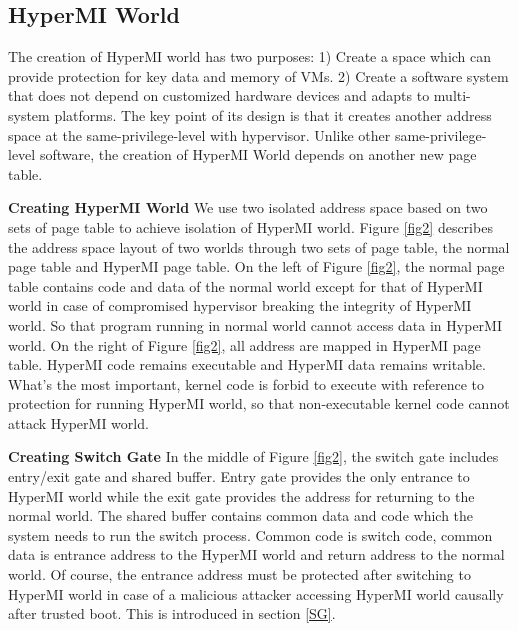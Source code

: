 \documentclass[conference]{IEEEtran}
\begin{document}
\subsection{HyperMI World} \label {HWorld}

The creation of HyperMI world has two purposes: 1) Create a space which can provide protection for key data and memory of VMs. 2) Create a software system that does not depend on customized hardware devices and adapts to multi-system platforms. The key point of its design is that it creates another address space at the same-privilege-level with hypervisor. Unlike other same-privilege-level software, the creation of HyperMI World depends on another new page table.

\textbf{Creating HyperMI World}
 We use two isolated address space based on two sets of page table to achieve isolation of HyperMI world.
Figure \ref{fig2} describes the address space layout of two worlds through two sets of page table, the normal page table and HyperMI page table. On the left of Figure \ref{fig2}, the normal page table contains code and data of the normal world except for that of HyperMI world in case of compromised hypervisor breaking the integrity of HyperMI world. So that program running in normal world cannot access data in HyperMI world. On the right of Figure \ref{fig2}, all address are mapped in HyperMI page table.
HyperMI code remains executable and HyperMI data remains writable. What's the most important, kernel code is forbid to execute with reference to protection for running HyperMI world, so that non-executable kernel code  cannot attack HyperMI world.

\textbf{Creating Switch Gate}
In the middle of Figure \ref{fig2}, the switch gate includes entry/exit gate and shared buffer. Entry gate provides the only entrance to HyperMI world while the exit gate provides the address for returning to the normal world. The shared buffer contains common data and code which the system needs to run the switch process. Common code is switch code, common data is entrance address to the HyperMI world and return address to the normal world. 
Of course, the entrance address must be protected after switching to HyperMI world in case of a malicious attacker accessing HyperMI world causally after trusted boot. This is introduced in section \ref{SG}.
\end{document}
